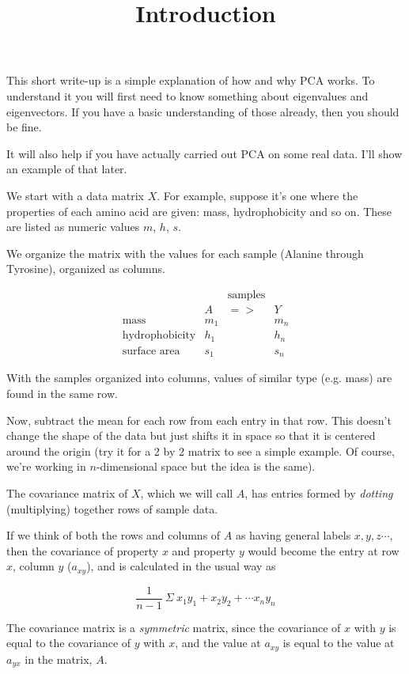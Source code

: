 \documentclass[11pt, oneside]{article}
\title{Introduction}
\date{}
\begin{document}
\maketitle
\Large

This short write-up is a simple explanation of how and why PCA works.  To understand it you will first need to know something about eigenvalues and eigenvectors.  If you have a basic understanding of those already, then you should be fine.

It will also help if you have actually carried out PCA on some real data.  I'll show an example of that later.

We start with a data matrix $X$.  For example, suppose it's one where the properties of each amino acid are given:  mass, hydrophobicity and so on.  These are listed as numeric values $m$, $h$, $s$.

We organize the matrix with the values for each sample (Alanine through Tyrosine), organized as columns.

\[
\begin{matrix}
  &   & \text{samples} &  \\
  & A & => & Y \\
\text{mass} & m_1 &  & m_n \\
\text{hydrophobicity} & h_1 &  & h_n \\
\text{surface area} & s_1 &  & s_n
\end{matrix}
\]

With the samples organized into columns, values of similar type (e.g. mass) are found in the same row.

Now, subtract the mean for each row from each entry in that row.  This doesn't change the shape of the data but just shifts it in space so that it is centered around the origin (try it for a 2 by 2 matrix to see a simple example.  Of course, we're working in $n$-dimensional space but the idea is the same).

The covariance matrix of $X$, which we will call $A$, has entries formed by \emph{dotting} (multiplying) together rows of sample data.

If we think of both the rows and columns of $A$ as having general labels $x,y,z \cdots$, then the covariance of property $x$ and property $y$ would become the entry at row $x$, column $y$ ($a_{xy}$), and is calculated in the usual way as

\[ \frac{1}{n-1} \ \Sigma \ x_1 y_1 + x_2 y_2 + \cdots x_n y_n \]

The covariance matrix is a \emph{symmetric} matrix, since the covariance of $x$ with $y$ is equal to the covariance of $y$ with $x$, and the value at $a_{xy}$ is equal to the value at $a_{yx}$ in the matrix, $A$.
\end{document}
